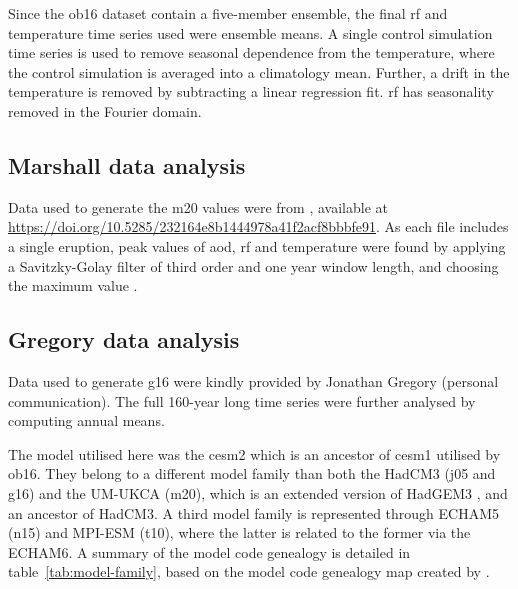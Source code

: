\documentclass{ametsocV6.1}
\begin{document}
Since the \gls{ob16} dataset contain a five-member ensemble, the final \gls{rf} and
temperature time series used were ensemble means. A single control simulation time
series is used to remove seasonal dependence from the temperature, where the control
simulation is averaged into a climatology mean. Further, a drift in the temperature is
removed by subtracting a linear regression fit. \gls{rf} has seasonality removed in the
Fourier domain.

\subsection{Marshall data analysis}\label{ap:m20}

Data used to generate the \gls{m20} values were from \citet{marshall2020dataset},
available at \url{https://doi.org/10.5285/232164e8b1444978a41f2acf8bbbfe91}. As each
file includes a single eruption, peak values of \gls{aod}, \gls{rf} and temperature were
found by applying a Savitzky-Golay filter of third order and one year window length, and
choosing the maximum value \citep{savitzky1964}.

\subsection{Gregory data analysis}\label{ap:g16}

Data used to generate \gls{g16} were kindly provided by Jonathan Gregory (personal
communication). The full 160-year long time series were further analysed by computing
annual means.

\appendix[C]


The model utilised here was the \gls{cesm2} which is an ancestor of \gls{cesm1} utilised
by \gls{ob16}. They belong to a different model family than both the HadCM3 (\gls{j05}
and \gls{g16}) and the UM-UKCA (\gls{m20}), which is an extended version of HadGEM3
\citep{dhomse2014}, and an ancestor of HadCM3. A third model family is represented
through ECHAM5 (\gls{n15}) and MPI-ESM (\gls{t10}), where the latter is related to the
former via the ECHAM6. A summary of the model code genealogy is detailed in
table~\ref{tab:model-family}, based on the model code genealogy map created by
\citet{kuma2023}.
\end{document}
